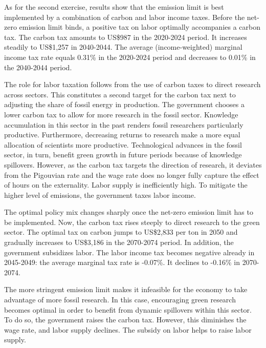 As for the second exercise, results show that the emission limit is best implemented by a combination of carbon and labor income taxes. Before the net-zero emission limit binds, a positive tax on labor optimally accompanies a carbon tax. The carbon tax amounts to US\$987 in the 2020-2024 period. It increases steadily to US\$1,257 in 2040-2044. The average (income-weighted) marginal income tax rate equals 0.31\% in the 2020-2024 period and decreases to 0.01\% in the 2040-2044 period.

The role for labor taxation follows from the use of carbon taxes to direct research across sectors. This constitutes a second target for the carbon tax next to adjusting the share of fossil energy in production. The government chooses a lower carbon tax to allow for more research in the fossil sector. Knowledge accumulation in this sector in the past renders fossil researchers particularly productive. Furthermore, decreasing returns to research make a more equal allocation of scientists more productive. Technological advances in the fossil sector, in turn, benefit green growth in future periods because of knowledge spillovers. However, as the carbon tax targets the direction of research, it deviates from the Pigouvian rate and the wage rate does no longer fully capture the effect of hours on the externality. Labor supply is inefficiently high.
To mitigate the higher level of emissions, the government taxes labor income. 

The optimal policy mix changes sharply once the net-zero emission limit has to be implemented. Now, the carbon tax rises steeply to direct research to the green sector. The optimal tax on carbon jumps to US\$2,833 per ton in 2050 and gradually increases to US\$3,186 in the 2070-2074 period. In addition, the government subsidizes labor. The labor income tax becomes negative already in 2045-2049: the average marginal tax rate is -0.07\%. It declines to -0.16\% in 2070-2074.

The more stringent emission limit makes it infeasible for the economy to take advantage of more fossil research. In this case, encouraging green research becomes optimal in order to benefit from dynamic spillovers within this sector. To do so, the government raises the carbon tax. However, this diminishes the wage rate, and labor supply declines. The subsidy on labor helps to raise labor supply.


